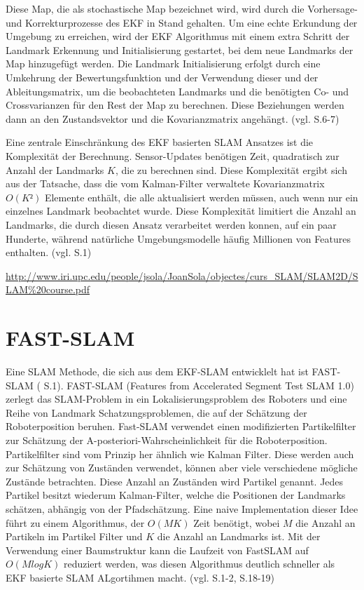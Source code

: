 Diese Map, die als stochastische Map bezeichnet wird, wird durch die Vorhersage- und Korrekturprozesse des EKF in Stand gehalten. Um eine echte Erkundung der Umgebung zu erreichen, wird der EKF Algorithmus mit einem extra Schritt der Landmark Erkennung und Initialisierung gestartet, bei dem neue Landmarks der Map hinzugefügt werden. Die Landmark Initialisierung erfolgt durch eine Umkehrung der Bewertungsfunktion und der Verwendung dieser und der Ableitungsmatrix, um die beobachteten Landmarks und die benötigten Co- und Crossvarianzen für den Rest der Map zu berechnen. Diese Beziehungen werden dann an den Zustandsvektor und die Kovarianzmatrix angehängt. (vgl. \cite{ekf_slam} S.6-7)

Eine zentrale Einschränkung des EKF basierten SLAM Ansatzes ist die Komplexität der Berechnung. Sensor-Updates benötigen Zeit, quadratisch zur Anzahl der Landmarks \(K\), die zu berechnen sind. Diese Komplexität ergibt sich aus der Tatsache, dass die vom Kalman-Filter verwaltete Kovarianzmatrix \(O(K²)\) Elemente enthält, die alle aktualisiert werden müssen, auch wenn nur ein einzelnes Landmark beobachtet wurde. Diese Komplexität limitiert die Anzahl an Landmarks, die durch diesen Ansatz verarbeitet werden konnen, auf ein paar Hunderte, während natürliche Umgebungsmodelle häufig Millionen von Features enthalten. (vgl. \cite{ekf_problems} S.1)

\url{http://www.iri.upc.edu/people/jsola/JoanSola/objectes/curs_SLAM/SLAM2D/SLAM%20course.pdf}

\section{FAST-SLAM}
Eine SLAM Methode, die sich aus dem EKF-SLAM entwicklelt hat ist FAST-SLAM (\cite{orb_slam} S.1). FAST-SLAM (Features from Accelerated Segment Test SLAM 1.0) zerlegt das SLAM-Problem in ein Lokalisierungsproblem des Roboters und eine Reihe von Landmark Schatzungsproblemen, die auf der Schätzung der Roboterposition beruhen. Fast-SLAM verwendet einen modifizierten Partikelfilter zur Schätzung der \glqq A-posteriori-Wahrscheinlichkeit\grqq{}  für die Roboterposition. Partikelfilter sind vom Prinzip her ähnlich wie Kalman Filter. Diese werden auch zur Schätzung von Zuständen verwendet, können aber viele verschiedene mögliche Zustände betrachten. Diese Anzahl an Zuständen wird Partikel genannt. Jedes Partikel besitzt wiederum Kalman-Filter, welche die Positionen der Landmarks schätzen, abhängig von der Pfadschätzung. Eine naive Implementation dieser Idee führt zu einem Algorithmus, der \(O(MK)\) Zeit benötigt, wobei \(M\) die Anzahl an Partikeln im Partikel Filter und \( K\) die Anzahl an Landmarks ist. Mit der Verwendung einer Baumstruktur kann die Laufzeit von FastSLAM auf \(O(MlogK)\) reduziert werden, was diesen Algorithmus deutlich schneller als EKF basierte SLAM ALgortihmen macht. (vgl. \cite{ekf_problems} S.1-2, \cite{slam_studi} S.18-19)

